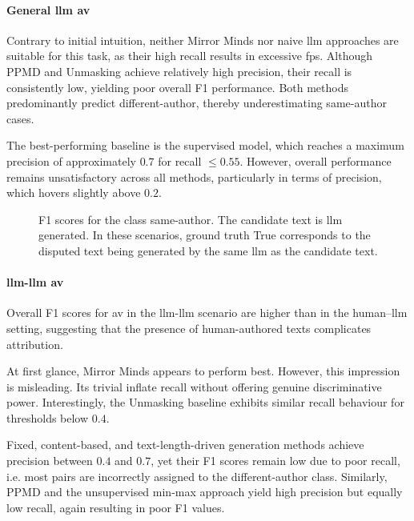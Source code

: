 \paragraph{General \ac{llm} \ac{av}}

Contrary to initial intuition, neither Mirror Minds nor naive \ac{llm} approaches are suitable for this task, as their high recall results in excessive \acp{fp}.  
Although PPMD and Unmasking achieve relatively high precision, their recall is consistently low, yielding poor overall F1 performance.  
Both methods predominantly predict different-author, thereby underestimating same-author cases.  

The best-performing baseline is the supervised model, which reaches a maximum precision of approximately $0.7$ for recall $\leq 0.55$.  
However, overall performance remains unsatisfactory across all methods, particularly in terms of precision, which hovers slightly above $0.2$.


\begin{figure}[h]
  \centering
  
  \caption{F1 scores for the class same-author. 
The candidate text is \ac{llm} generated.
In these scenarios, ground truth True corresponds to the disputed text being generated by the same \ac{llm} as the candidate text.
}
  \label{fig:llm_av_prec}
\end{figure}



\paragraph{\ac{llm}-\ac{llm} \ac{av}}

Overall F1 scores for \ac{av} in the \ac{llm}-\ac{llm} scenario are higher than in the human–\ac{llm} setting, suggesting that the presence of human-authored texts complicates attribution.  

At first glance, Mirror Minds appears to perform best. 
However, this impression is misleading.  
Its trivial \imps{} inflate recall without offering genuine discriminative power.  
Interestingly, the Unmasking baseline exhibits similar recall behaviour for thresholds below $0.4$.  

Fixed, content-based, and text-length-driven \imp{} generation methods achieve precision between $0.4$ and $0.7$, yet their F1 scores remain low due to poor recall, i.e. most pairs are incorrectly assigned to the different-author class.  
Similarly, PPMD and the unsupervised min-max approach yield high precision but equally low recall, again resulting in poor F1 values.  

